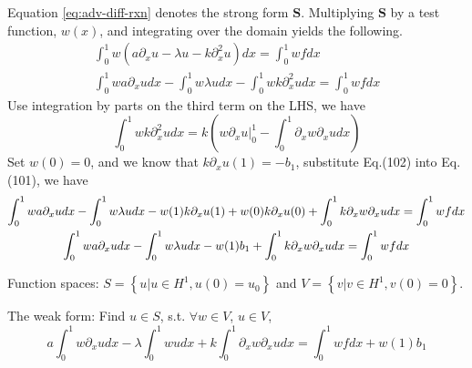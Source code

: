 \begin{solution}
    Equation \eqref{eq:adv-diff-rxn} denotes the strong form $\textbf{S}$. Multiplying $\textbf{S}$ by a test function, $w(x)$, and integrating over the domain yields the following.
    \begin{gather}
        \int_0^1 w\left(a\partial_{x}u -\lambda u - k\partial_{x}^{2}u\right) dx = \int_0^1 wf dx \\
        \int_0^1 wa\partial_{x}u dx -\int_0^1 w\lambda u dx - \int_0^1 wk\partial_{x}^{2}u dx = \int_0^1 wf dx
    \end{gather}
    Use integration by parts on the third term on the LHS, we have
    \begin{equation}
        \int_0^1 wk\partial_{x}^{2}u dx = k \left( w \partial_{x}u \Big|_0^1 - \int_0^1 \partial_{x}w \partial_{x}u dx \right)
    \end{equation}
    Set $w(0) = 0$, and we know that $k\partial_{x}u(1) = -b_1$, substitute Eq.(102) into Eq.(101), we have
    \begin{gather}
        \int_0^1 wa\partial_{x}u dx -\int_0^1 w\lambda u dx - w(1)k\partial_{x}u(1) + w(0)k\partial_{x}u(0) + \int_0^1 k\partial_{x}w \partial_{x}u dx = \int_0^1 wf dx \notag \\
        \int_0^1 wa\partial_{x}u dx -\int_0^1 w\lambda u dx - w(1)b_1 + \int_0^1 k\partial_{x}w \partial_{x}u dx = \int_0^1 wf dx
    \end{gather}
    
    Function spaces: $S = \left \{ u \Big| u \in H^1, u(0) = u_0 \right \}$ and $V = \left \{ v \Big| v \in H^1, v(0) = 0 \right \}$.

	\begin{tcolorbox}
	The weak form: Find $u \in S$, s.t. $\forall w \in V$, $u \in V$, 
	\begin{equation*}
	a\int_0^1 w\partial_{x}u dx - \lambda \int_0^1 w u dx + k \int_0^1 \partial_{x}w \partial_{x}u dx = \int_0^1 wf dx + w(1)b_1
	\end{equation*}
	
	\end{tcolorbox}    
    
   

\end{solution}